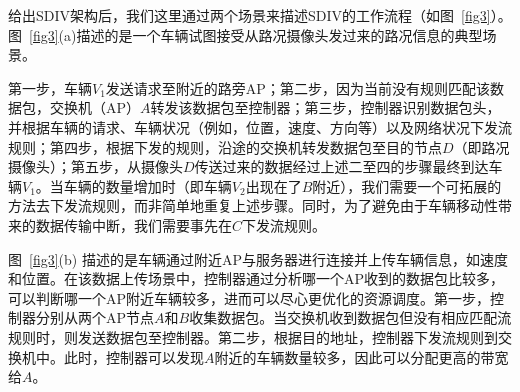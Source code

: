 给出SDIV架构后，我们这里通过两个场景来描述SDIV的工作流程（如图~\ref{fig3}）。
图~\ref{fig3}(a)描述的是一个车辆试图接受从路况摄像头发过来的路况信息的典型场景。


第一步，车辆$V_{1}$发送请求至附近的路旁AP；第二步，因为当前没有规则匹配该数据包，交换机（AP）$A$转发该数据包至控制器；第三步，控制器识别数据包头，并根据车辆的请求、车辆状况（例如，位置，速度、方向等）以及网络状况下发流规则；第四步，根据下发的规则，沿途的交换机转发数据包至目的节点$D$（即路况摄像头）；第五步，从摄像头$D$传送过来的数据经过上述二至四的步骤最终到达车辆$V_{1}$。当车辆的数量增加时（即车辆$V_{2}$出现在了$B$附近），我们需要一个可拓展的方法去下发流规则，而非简单地重复上述步骤。同时，为了避免由于车辆移动性带来的数据传输中断，我们需要事先在$C$下发流规则。


图~\ref{fig3}(b) 描述的是车辆通过附近AP与服务器进行连接并上传车辆信息，如速度和位置。在该数据上传场景中，控制器通过分析哪一个AP收到的数据包比较多，可以判断哪一个AP附近车辆较多，进而可以尽心更优化的资源调度。第一步，控制器分别从两个AP节点$A$和$B$收集数据包。当交换机收到数据包但没有相应匹配流规则时，则发送数据包至控制器。第二步，根据目的地址，控制器下发流规则到交换机中。此时，控制器可以发现$A$附近的车辆数量较多，因此可以分配更高的带宽给$A$。

